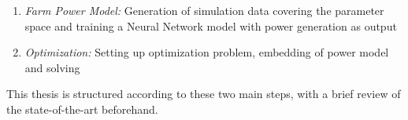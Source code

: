 \begin{enumerate}
	\item \textit{Farm Power Model:} Generation of simulation data covering the parameter space and training a Neural Network model with power generation as output
	\item \textit{Optimization:} Setting up optimization problem, embedding of power model and solving
\end{enumerate}

This thesis is structured according to these two main steps, with a brief review of the state-of-the-art beforehand. 








